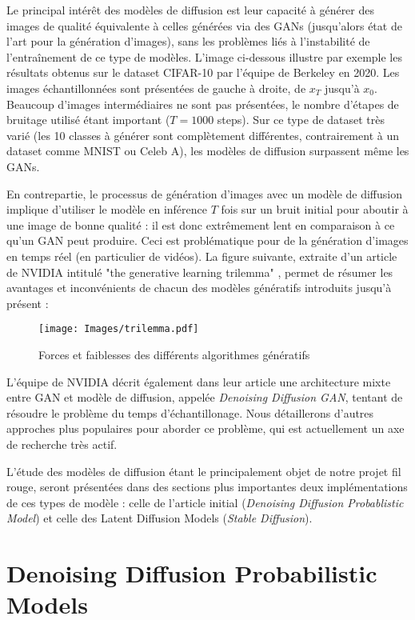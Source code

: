 \documentclass{article}
\begin{document}
Le principal intérêt des modèles de diffusion est leur capacité à générer des images de qualité équivalente à celles générées via des GANs (jusqu'alors état de l'art pour la génération d'images), sans les problèmes liés à l'instabilité de l'entraînement de ce type de modèles. L'image ci-dessous illustre par exemple les résultats obtenus sur le dataset CIFAR-10 par l'équipe de Berkeley en 2020. Les images échantillonnées sont présentées de gauche à droite, de $x_T$ jusqu'à $x_0$. Beaucoup d'images intermédiaires ne sont pas présentées, le nombre d'étapes de bruitage utilisé étant important ($T = 1000$ steps). Sur ce type de dataset très varié (les 10 classes à générer sont complètement différentes, contrairement à un dataset comme MNIST ou Celeb A), les modèles de diffusion surpassent même les GANs.

En contrepartie, le processus de génération d'images avec un modèle de diffusion implique d'utiliser le modèle en inférence $T$ fois sur un bruit initial pour aboutir à une image de bonne qualité : il est donc extrêmement lent en comparaison à ce qu'un GAN peut produire. Ceci est problématique pour de la génération d'images en temps réel (en particulier de vidéos). La figure suivante, extraite d'un article de NVIDIA intitulé "the generative learning trilemma" \cite{NVIDIA}, permet de résumer les avantages et inconvénients de chacun des modèles génératifs introduits jusqu'à présent :

\begin{figure}[H]
    \centering
    \texttt{[image: Images/trilemma.pdf]}
    \caption{Forces et faiblesses des différents algorithmes génératifs}
\end{figure}

L'équipe de NVIDIA décrit également dans leur article une architecture mixte entre GAN et modèle de diffusion, appelée \textit{Denoising Diffusion GAN}, tentant de résoudre le problème du temps d'échantillonage. Nous détaillerons d'autres approches plus populaires pour aborder ce problème, qui est actuellement un axe de recherche très actif.

L'étude des modèles de diffusion étant le principalement objet de notre projet fil rouge, seront présentées dans des sections plus importantes deux implémentations de ces types de modèle : celle de l'article initial (\textit{Denoising Diffusion Probablistic Model}) et celle des Latent Diffusion Models (\textit{Stable Diffusion}).

\clearpage

\section{Denoising Diffusion Probabilistic Models}
\end{document}
